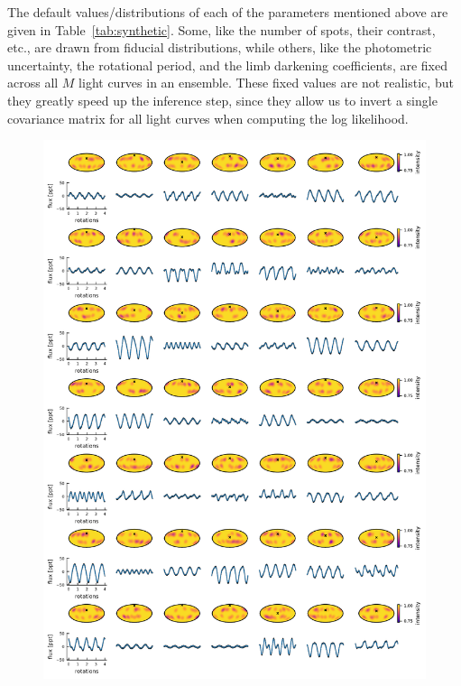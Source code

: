 \documentclass[modern,linenumbers]{aastex62}
\begin{document}
The default values/distributions of each of the parameters mentioned above are given in
Table~\ref{tab:synthetic}. Some, like the number of spots, their contrast,
etc., are drawn from fiducial distributions, while others, like the
photometric uncertainty, the rotational period, and the limb darkening
coefficients,
are fixed across all $M$ light curves in an ensemble. These fixed values
are not realistic, but they greatly speed up the inference step, since they
allow us to invert a single covariance matrix for all light curves when computing
the log likelihood.

\begin{figure}[p!]
    \begin{centering}
        \includegraphics[width=0.9\linewidth]{figures/calibration_default_data.pdf}
    \end{centering}
\end{figure}
\end{document}
